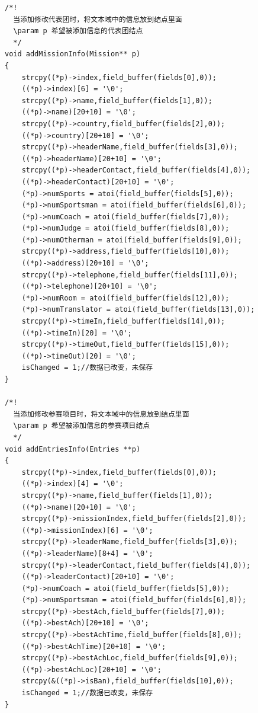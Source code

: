 \documentclass[10pt,a4paper]{article}
\begin{document}
\begin{footnotesize}
\begin{verbatim}
/*!
  当添加修改代表团时，将文本域中的信息放到结点里面
  \param p 希望被添加信息的代表团结点
  */
void addMissionInfo(Mission** p)
{
    strcpy((*p)->index,field_buffer(fields[0],0));
    ((*p)->index)[6] = '\0';
    strcpy((*p)->name,field_buffer(fields[1],0));
    ((*p)->name)[20+10] = '\0';
    strcpy((*p)->country,field_buffer(fields[2],0));
    ((*p)->country)[20+10] = '\0';
    strcpy((*p)->headerName,field_buffer(fields[3],0));
    ((*p)->headerName)[20+10] = '\0';
    strcpy((*p)->headerContact,field_buffer(fields[4],0));
    ((*p)->headerContact)[20+10] = '\0';
    (*p)->numSports = atoi(field_buffer(fields[5],0));
    (*p)->numSportsman = atoi(field_buffer(fields[6],0));
    (*p)->numCoach = atoi(field_buffer(fields[7],0));
    (*p)->numJudge = atoi(field_buffer(fields[8],0));
    (*p)->numOtherman = atoi(field_buffer(fields[9],0));
    strcpy((*p)->address,field_buffer(fields[10],0));
    ((*p)->address)[20+10] = '\0';
    strcpy((*p)->telephone,field_buffer(fields[11],0));
    ((*p)->telephone)[20+10] = '\0';
    (*p)->numRoom = atoi(field_buffer(fields[12],0));
    (*p)->numTranslator = atoi(field_buffer(fields[13],0));
    strcpy((*p)->timeIn,field_buffer(fields[14],0));
    ((*p)->timeIn)[20] = '\0';
    strcpy((*p)->timeOut,field_buffer(fields[15],0));
    ((*p)->timeOut)[20] = '\0';
    isChanged = 1;//数据已改变，未保存
}

/*!
  当添加修改参赛项目时，将文本域中的信息放到结点里面
  \param p 希望被添加信息的参赛项目结点
  */
void addEntriesInfo(Entries **p)
{
    strcpy((*p)->index,field_buffer(fields[0],0));
    ((*p)->index)[4] = '\0';
    strcpy((*p)->name,field_buffer(fields[1],0));
    ((*p)->name)[20+10] = '\0';
    strcpy((*p)->missionIndex,field_buffer(fields[2],0));
    ((*p)->missionIndex)[6] = '\0';
    strcpy((*p)->leaderName,field_buffer(fields[3],0));
    ((*p)->leaderName)[8+4] = '\0';
    strcpy((*p)->leaderContact,field_buffer(fields[4],0));
    ((*p)->leaderContact)[20+10] = '\0';
    (*p)->numCoach = atoi(field_buffer(fields[5],0));
    (*p)->numSportsman = atoi(field_buffer(fields[6],0));
    strcpy((*p)->bestAch,field_buffer(fields[7],0));
    ((*p)->bestAch)[20+10] = '\0';
    strcpy((*p)->bestAchTime,field_buffer(fields[8],0));
    ((*p)->bestAchTime)[20+10] = '\0';
    strcpy((*p)->bestAchLoc,field_buffer(fields[9],0));
    ((*p)->bestAchLoc)[20+10] = '\0';
    strcpy(&((*p)->isBan),field_buffer(fields[10],0));
    isChanged = 1;//数据已改变，未保存
}


\end{verbatim}
\end{footnotesize}
\end{document}
